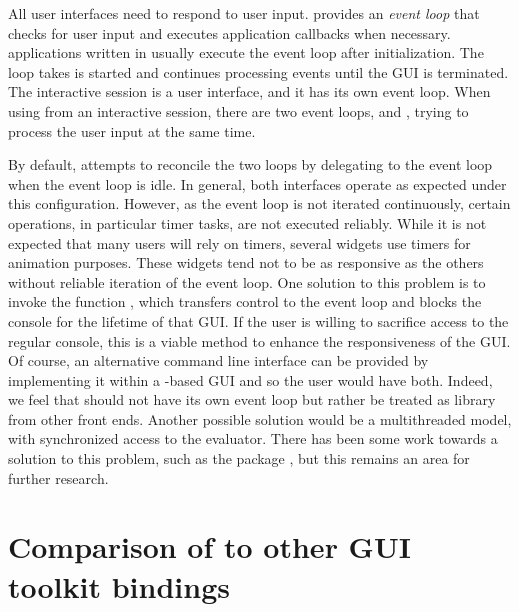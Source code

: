 \documentclass[article,shortnames]{jss}
\begin{document}
All user interfaces need to respond to user input.  provides
an \emph{event loop} that checks for user input and executes
application callbacks when necessary.  applications written
in  usually execute the  event loop after
initialization. The loop takes is started and continues processing
events until the GUI is terminated. The interactive 
session is a user interface, and it has its own event loop. When using
 from an interactive session, there are two event loops,
 and , trying to process the user input at the
same
time.

By default,  attempts to reconcile the two loops by
delegating to the  event loop when the  event
loop is idle. In general, both interfaces operate as expected under
this configuration. However, as the  event loop is not
iterated continuously, certain operations, in particular timer tasks,
are not executed reliably. While it is not expected that many
 users will rely on timers, several  widgets use
timers for animation purposes. These widgets tend not to be as
responsive as the others without reliable iteration of the 
event loop. One solution to this problem is to invoke the 
function
, which transfers control to the  event loop
and blocks the  console for the lifetime of that GUI.  If
the user is willing to sacrifice access to the regular 
console, this is a viable method to enhance the responsiveness of the
 GUI.  Of course, an alternative command line interface can
be provided by implementing it within a -based GUI and so
the user
would have both. Indeed, we feel that  should not have its
own event
loop but rather be treated as library from other front ends.  Another
possible solution would be a multithreaded model, with synchronized
access to the  evaluator. There has been some work towards
a solution to this problem, such as the  package
\citep{REventLoop}, but this remains an area for further
research.

\section[Comparison of RGtk2 to other R GUI toolkit
bindings]{Comparison of  to other  GUI toolkit
bindings}\label{sec:comparison}
\end{document}
